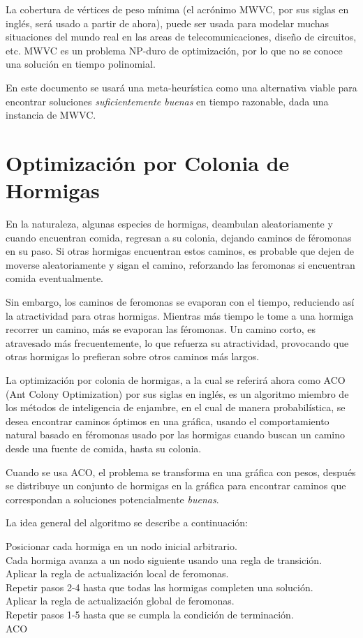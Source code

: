 \documentclass[12pt, letterpaper]{article}
\begin{document}
La cobertura de vértices de peso mínima (el acrónimo MWVC, por sus siglas en inglés, será usado a partir de ahora), puede ser usada para modelar muchas situaciones del mundo real en las areas de telecomunicaciones, diseño de circuitos, etc. MWVC es un problema NP-duro de optimización, por lo que no se conoce una solución en tiempo polinomial.
\par
En este documento se usará una meta-heurística como una alternativa viable para encontrar soluciones \textit{suficientemente buenas} en tiempo razonable, dada una instancia de MWVC.

\section{Optimización por Colonia de Hormigas}
En la naturaleza, algunas especies de hormigas, deambulan aleatoriamente y cuando encuentran comida, regresan a su colonia, dejando caminos de féromonas en su paso. Si otras hormigas encuentran estos caminos, es probable que dejen de moverse aleatoriamente y sigan el camino, reforzando las feromonas si encuentran comida eventualmente.
\par
Sin embargo, los caminos de feromonas se evaporan con el tiempo, reduciendo así la atractividad para otras hormigas. Mientras más tiempo le tome a una hormiga recorrer un camino, más se evaporan las féromonas. Un camino corto, es atravesado más frecuentemente, lo que refuerza su atractividad, provocando que otras hormigas lo prefieran sobre otros caminos más largos.
\par
La optimización por colonia de hormigas, a la cual se referirá ahora como ACO (Ant Colony Optimization) por sus siglas en inglés, es un algoritmo miembro de los métodos de inteligencia de enjambre, en el cual de manera probabilística, se desea encontrar caminos óptimos en una gráfica, usando el comportamiento natural basado en féromonas usado por las hormigas cuando buscan un camino desde una fuente de comida, hasta su colonia.
\par
Cuando se usa ACO, el problema se transforma en una gráfica con pesos, después se distribuye un conjunto de hormigas en la gráfica para encontrar caminos que correspondan a soluciones potencialmente \textit{buenas}.
\par
La idea general del algoritmo se describe a continuación:

\bigskip
\LinesNumbered
\begin{algorithm}[H]
Posicionar cada hormiga en un nodo inicial arbitrario.\\
Cada hormiga avanza a un nodo siguiente usando una regla de transición.\\
Aplicar la regla de actualización local de feromonas.\\
Repetir pasos 2-4 hasta que todas las hormigas completen una solución.\\
Aplicar la regla de actualización global de feromonas.\\
Repetir pasos 1-5 hasta que se cumpla la condición de terminación.\\
\caption{ACO}
\label{proc:1}
\end{algorithm}
\LinesNotNumbered
\bigskip
\end{document}
